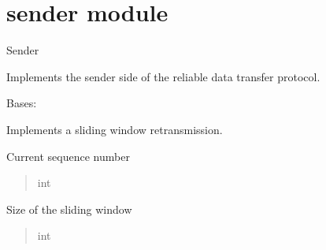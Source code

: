 \documentclass[letterpaper,10pt,english]{sphinxmanual}
\begin{document}
\sphinxstepscope


\section{sender module}
\label{\detokenize{sender:module-sender}}\label{\detokenize{sender:sender-module}}\label{\detokenize{sender::doc}}
\sphinxAtStartPar
Sender

\sphinxAtStartPar
Implements the sender side of the reliable data transfer protocol.

\begin{fulllineitems}
\label{\detokenize{sender:sender.Sender}}
\pysigstartsignatures
\pysiglinewithargsret
{}
{\sphinxparamcomma {}}
{}
\pysigstopsignatures
\sphinxAtStartPar
Bases: 

\sphinxAtStartPar
Implements a sliding window retransmission.

\begin{fulllineitems}
\label{\detokenize{sender:sender.Sender.seq_num}}
\pysigstartsignatures
\pysigline
{}
\pysigstopsignatures
\sphinxAtStartPar
Current sequence number
\begin{quote}\begin{description}
\sphinxAtStartPar
int

\end{description}\end{quote}

\end{fulllineitems}


\begin{fulllineitems}
\label{\detokenize{sender:sender.Sender.window_size}}
\pysigstartsignatures
\pysigline
{}
\pysigstopsignatures
\sphinxAtStartPar
Size of the sliding window
\begin{quote}\begin{description}
\sphinxAtStartPar
int


\end{description}
\end{quote}
\end{fulllineitems}
\end{fulllineitems}
\end{document}
